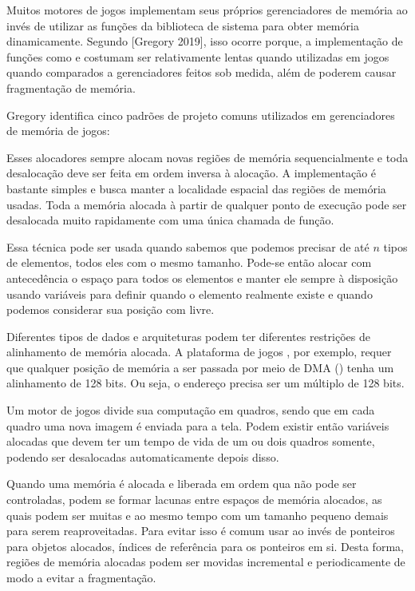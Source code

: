 

Muitos motores de jogos implementam seus próprios gerenciadores de
memória ao invés de utilizar as funções da biblioteca de sistema para
obter memória dinamicamente. Segundo [Gregory 2019], isso ocorre
porque, a implementação de funções como 
e  costumam ser relativamente lentas quando utilizadas
em jogos quando comparados a gerenciadores feitos sob medida, além de
poderem causar fragmentação de memória.

Gregory identifica cinco padrões de projeto comuns utilizados em
gerenciadores de memória de jogos:

 Esses alocadores
sempre alocam novas regiões de memória sequencialmente e toda
desalocação deve ser feita em ordem inversa à alocação. A
implementação é bastante simples e busca manter a localidade espacial
das regiões de memória usadas. Toda a memória alocada à partir de
qualquer ponto de execução pode ser desalocada muito rapidamente com
uma única chamada de função.

 Essa técnica pode ser usada quando
sabemos que podemos precisar de até $n$ tipos de elementos, todos eles
com o mesmo tamanho. Pode-se então alocar com antecedência o espaço
para todos os elementos e manter ele sempre à disposição usando
variáveis para definir quando o elemento realmente existe e quando
podemos considerar sua posição com livre.

 Diferentes tipos de dados e arquiteturas podem
ter diferentes restrições de alinhamento de memória alocada. A
plataforma de jogos , por exemplo, requer que
qualquer posição de memória a ser passada por meio de DMA
() tenha um alinhamento de 128 bits. Ou seja,
o endereço precisa ser um múltiplo de 128 bits.

 Um motor de jogos divide
sua computação em quadros, sendo que em cada quadro uma nova imagem é
enviada para a tela. Podem existir então variáveis alocadas que devem
ter um tempo de vida de um ou dois quadros somente, podendo ser
desalocadas automaticamente depois disso.

 Quando uma memória é alocada e
liberada em ordem qua não pode ser controladas, podem se formar
lacunas entre espaços de memória alocados, as quais podem ser muitas e
ao mesmo tempo com um tamanho pequeno demais para serem reaproveitadas.
Para evitar isso é comum usar ao invés de ponteiros para objetos alocados,
índices de referência para os ponteiros em si. Desta forma, regiões de
memória alocadas podem ser movidas incremental e periodicamente de modo a
evitar a fragmentação.

